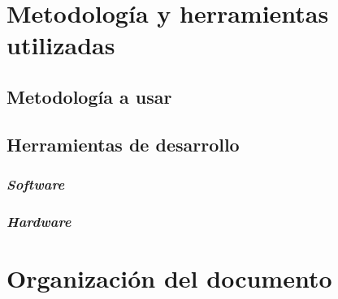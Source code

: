 \section{Metodología y herramientas utilizadas}
\label{sec:metodologia-herramientas}


\subsection{Metodología a usar}
\label{subsec:metodologia}

\subsection{Herramientas de desarrollo}
\label{subsec:herramientas}

\subsubsection*{\textit{Software}}

\subsubsection*{\textit{Hardware}}

\section{Organización del documento}
\label{sec:organizacion}